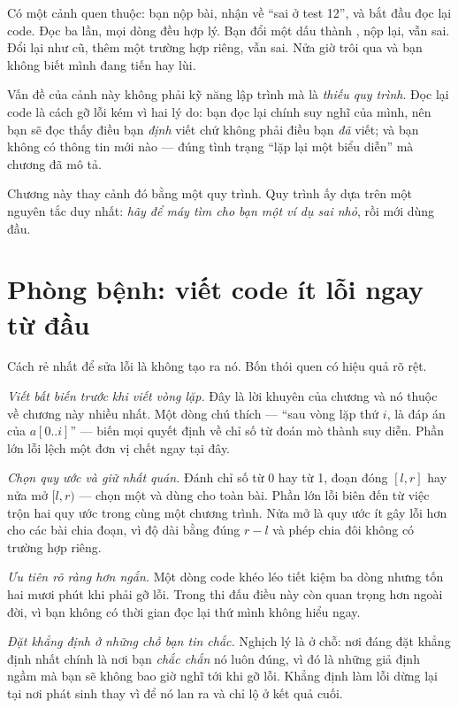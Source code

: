 \documentclass[../../algorithm.tex]{subfiles}
\begin{document}
Có một cảnh quen thuộc: bạn nộp bài, nhận về ``sai ở test 12'', và bắt đầu đọc lại code. Đọc ba lần, mọi dòng đều hợp lý. Bạn đổi một dấu \code{<} thành \code{<=}, nộp lại, vẫn sai. Đổi lại như cũ, thêm một trường hợp riêng, vẫn sai. Nửa giờ trôi qua và bạn không biết mình đang tiến hay lùi.

Vấn đề của cảnh này không phải kỹ năng lập trình mà là \emph{thiếu quy trình}. Đọc lại code là cách gỡ lỗi kém vì hai lý do: bạn đọc lại chính suy nghĩ của mình, nên bạn sẽ đọc thấy điều bạn \emph{định} viết chứ không phải điều bạn \emph{đã} viết; và bạn không có thông tin mới nào --- đúng tình trạng ``lặp lại một biểu diễn'' mà chương  đã mô tả.

Chương này thay cảnh đó bằng một quy trình. Quy trình ấy dựa trên một nguyên tắc duy nhất: \emph{hãy để máy tìm cho bạn một ví dụ sai nhỏ}, rồi mới dùng đầu.

\section{Phòng bệnh: viết code ít lỗi ngay từ đầu}

Cách rẻ nhất để sửa lỗi là không tạo ra nó. Bốn thói quen có hiệu quả rõ rệt.

\emph{Viết bất biến trước khi viết vòng lặp.} Đây là lời khuyên của chương  và nó thuộc về chương này nhiều nhất. Một dòng chú thích --- ``sau vòng lặp thứ \(i\),  là đáp án của \(a[0..i]\)'' --- biến mọi quyết định về chỉ số từ đoán mò thành suy diễn. Phần lớn lỗi lệch một đơn vị chết ngay tại đây.

\emph{Chọn quy ước và giữ nhất quán.} Đánh chỉ số từ 0 hay từ 1, đoạn đóng \([l,r]\) hay nửa mở \([l,r)\) --- chọn một và dùng cho toàn bài. Phần lớn lỗi biên đến từ việc trộn hai quy ước trong cùng một chương trình. Nửa mở là quy ước ít gây lỗi hơn cho các bài chia đoạn, vì độ dài bằng đúng \(r-l\) và phép chia đôi không có trường hợp riêng.

\emph{Ưu tiên rõ ràng hơn ngắn.} Một dòng code khéo léo tiết kiệm ba dòng nhưng tốn hai mươi phút khi phải gỡ lỗi. Trong thi đấu điều này còn quan trọng hơn ngoài đời, vì bạn không có thời gian đọc lại thứ mình không hiểu ngay.

\emph{Đặt khẳng định ở những chỗ bạn tin chắc.} Nghịch lý là ở chỗ: nơi đáng đặt khẳng định nhất chính là nơi bạn \emph{chắc chắn} nó luôn đúng, vì đó là những giả định ngầm mà bạn sẽ không bao giờ nghĩ tới khi gỡ lỗi. Khẳng định làm lỗi dừng lại tại nơi phát sinh thay vì để nó lan ra và chỉ lộ ở kết quả cuối.
\end{document}
